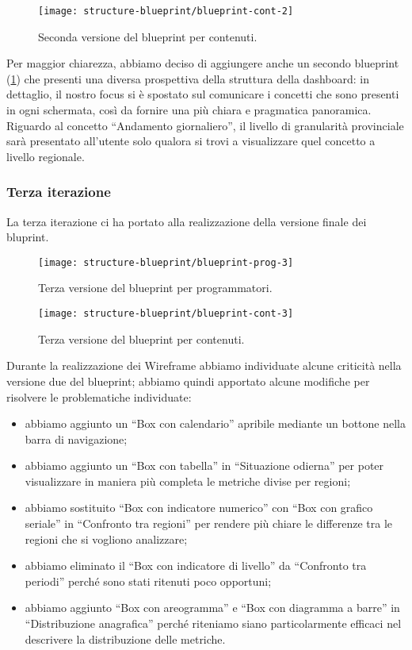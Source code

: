 \begin{figure}[H]
    \centering
    \texttt{[image: structure-blueprint/blueprint-cont-2]}
    \caption{Seconda versione del blueprint per contenuti.}\label{fig:blueprint-cont-2}
\end{figure}
Per maggior chiarezza, abbiamo deciso di aggiungere anche un secondo blueprint (\ref{fig:blueprint-cont-2}) che presenti una diversa prospettiva della struttura della dashboard: in dettaglio, il nostro focus si è spostato sul comunicare i concetti che sono presenti in ogni schermata, così da fornire una più chiara e pragmatica panoramica.
Riguardo al concetto ``Andamento giornaliero'', il livello di granularità provinciale sarà presentato all'utente solo qualora si trovi a visualizzare quel concetto a livello regionale.

\subsubsection{Terza iterazione}
La terza iterazione ci ha portato alla realizzazione della versione finale dei bluprint.
\begin{figure}[H]
    \centering
    \texttt{[image: structure-blueprint/blueprint-prog-3]}
    \caption{Terza versione del blueprint per programmatori.}\label{fig:blueprint-prog-3}
\end{figure}
\begin{figure}[H]
    \centering
    \texttt{[image: structure-blueprint/blueprint-cont-3]}
    \caption{Terza versione del blueprint per contenuti.}\label{fig:blueprint-cont-3}
\end{figure}
Durante la realizzazione dei Wireframe abbiamo individuate alcune criticità nella versione due del blueprint; abbiamo quindi apportato alcune modifiche per risolvere le problematiche individuate:
\begin{itemize}
    \item abbiamo aggiunto un ``Box con calendario'' apribile mediante un bottone nella barra di navigazione;
    \item abbiamo aggiunto un ``Box con tabella'' in ``Situazione odierna'' per poter visualizzare in maniera più completa le metriche divise per regioni;
    \item abbiamo sostituito ``Box con indicatore numerico'' con  ``Box con grafico seriale'' in ``Confronto tra regioni'' per rendere più chiare le differenze tra le regioni che si vogliono analizzare;
    \item abbiamo eliminato il ``Box con indicatore di livello'' da ``Confronto tra periodi'' perché sono stati ritenuti poco opportuni;
    \item abbiamo aggiunto ``Box con areogramma'' e ``Box con diagramma a barre'' in ``Distribuzione anagrafica'' perché riteniamo siano particolarmente efficaci nel descrivere la distribuzione delle metriche.
\end{itemize}
